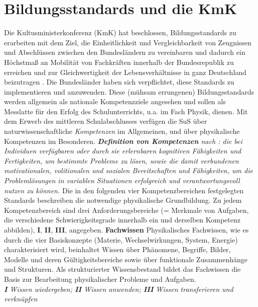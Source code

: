 
\section{Bildungsstandards und die KmK}\label{KmK}
Die Kultusministerkonferenz (KmK) hat beschlossen, Bildungsstandards zu erarbeiten mit dem Ziel, die Einheitlichkeit und Vergleichbarkeit von Zeugnissen und Abschl{\"u}ssen zwischen den Bundesl{\"a}ndern zu vereinbaren und dadurch ein H{\"o}chstma{\ss} an Mobilit{\"a}t von Fachkr{\"a}ften innerhalb der Bundesrepublik zu erreichen und  zur Gleichwertigkeit der Lebensverh{\"a}ltnisse in ganz Deutschland beizutragen \autocite{KMK}. Die Bundesl{\"a}nder haben sich verpflichtet, diese Standards zu implementieren und anzuwenden. Diese (m{\"u}hsam errungenen) Bildungsstandards werden allgemein als nationale Kompetenzziele angesehen und sollen als Messlatte f{\"u}r den Erfolg des Schulunterrichts, u.a. im Fach Physik, dienen. 
\mip
Mit dem Erwerb des mittleren Schulabschlusses verf{\"u}gen die SuS {\"u}ber naturwissenschaftliche \emph{Kompetenzen} im Allgemeinen, und {\"u}ber physikalische Kompetenzen im Besonderen. 
\mip
\leftskip=0.5cm \rightskip=0.5cm {\emph{{\textbf{Definition von Kompetenzen}} nach \textcite{Weinert}: die bei Individuen verf{\"u}gbaren oder durch sie erlernbaren kognitiven F{\"a}higkeiten und Fertigkeiten, um bestimmte Probleme zu 
l{\"o}sen, sowie die damit verbundenen motivationalen, volitionalen und sozialen Bereitschaften und F{\"a}higkeiten, um die Probleml{\"o}sungen in variablen Situationen erfolgreich und verantwortungsvoll nutzen zu k{\"o}nnen.}} 
\mip
\leftskip=0cm \rightskip=0cm Die in den folgenden vier Kompetenzbereichen festgelegten Standards beschreiben die notwendige physikalische Grundbildung. Zu jedem Kompetenzbereich sind drei Anforderungsbereiche  (= Merkmale von Aufgaben, die verschiedene Schwierigkeitsgrade innerhalb ein und derselben Kompetenz abbilden), \textbf{I}, \textbf{II}, \textbf{III}, angegeben. 
\mip
{\textbf{Fachwissen}} \tabto{7em} \hangindent=2.7cm Physikalisches Fachwissen, wie es durch die vier Basiskonzepte (Materie, Wechselwirkungen, System, Energie) charakterisiert wird, beinhaltet Wissen {\"u}ber Ph{\"a}nomene, Begriffe, Bilder, Modelle und deren G{\"u}ltigkeitsbereiche sowie {\"u}ber funktionale Zusammenh{\"a}nge und Strukturen. Als strukturierter Wissensbestand bildet das Fachwissen die Basis zur Bearbeitung physikalischer Probleme und Aufgaben. \\ \emph{\textbf{I} Wissen wiedergeben; \textbf{II} Wissen anwenden; \textbf{III} Wissen transferieren und verkn{\"u}pfen}
